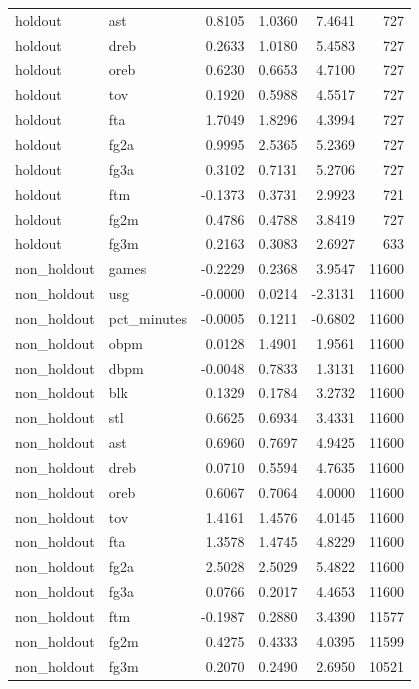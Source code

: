 \begin{table}
\begin{tabular}{llrrrr}
holdout & ast & 0.8105 & 1.0360 & 7.4641 & 727 \\
holdout & dreb & 0.2633 & 1.0180 & 5.4583 & 727 \\
holdout & oreb & 0.6230 & 0.6653 & 4.7100 & 727 \\
holdout & tov & 0.1920 & 0.5988 & 4.5517 & 727 \\
holdout & fta & 1.7049 & 1.8296 & 4.3994 & 727 \\
holdout & fg2a & 0.9995 & 2.5365 & 5.2369 & 727 \\
holdout & fg3a & 0.3102 & 0.7131 & 5.2706 & 727 \\
holdout & ftm & -0.1373 & 0.3731 & 2.9923 & 721 \\
holdout & fg2m & 0.4786 & 0.4788 & 3.8419 & 727 \\
holdout & fg3m & 0.2163 & 0.3083 & 2.6927 & 633 \\
non\_holdout & games & -0.2229 & 0.2368 & 3.9547 & 11600 \\
non\_holdout & usg & -0.0000 & 0.0214 & -2.3131 & 11600 \\
non\_holdout & pct\_minutes & -0.0005 & 0.1211 & -0.6802 & 11600 \\
non\_holdout & obpm & 0.0128 & 1.4901 & 1.9561 & 11600 \\
non\_holdout & dbpm & -0.0048 & 0.7833 & 1.3131 & 11600 \\
non\_holdout & blk & 0.1329 & 0.1784 & 3.2732 & 11600 \\
non\_holdout & stl & 0.6625 & 0.6934 & 3.4331 & 11600 \\
non\_holdout & ast & 0.6960 & 0.7697 & 4.9425 & 11600 \\
non\_holdout & dreb & 0.0710 & 0.5594 & 4.7635 & 11600 \\
non\_holdout & oreb & 0.6067 & 0.7064 & 4.0000 & 11600 \\
non\_holdout & tov & 1.4161 & 1.4576 & 4.0145 & 11600 \\
non\_holdout & fta & 1.3578 & 1.4745 & 4.8229 & 11600 \\
non\_holdout & fg2a & 2.5028 & 2.5029 & 5.4822 & 11600 \\
non\_holdout & fg3a & 0.0766 & 0.2017 & 4.4653 & 11600 \\
non\_holdout & ftm & -0.1987 & 0.2880 & 3.4390 & 11577 \\
non\_holdout & fg2m & 0.4275 & 0.4333 & 4.0395 & 11599 \\
non\_holdout & fg3m & 0.2070 & 0.2490 & 2.6950 & 10521 \\
\bottomrule
\end{tabular}
\end{table}
